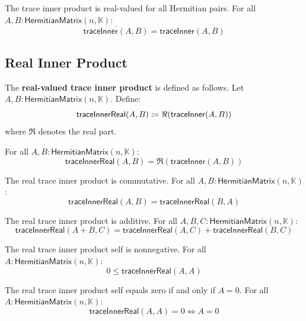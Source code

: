 \begin{theorem}
The trace inner product is real-valued for all Hermitian pairs. For all $A, B : \mathsf{HermitianMatrix}(n, \mathbb{K})$:
\[ \overline{\mathsf{traceInner}(A, B)} = \mathsf{traceInner}(A, B) \]
\end{theorem}

\subsection{Real Inner Product}

\begin{definition}[traceInnerReal]
The \textbf{real-valued trace inner product} is defined as follows. Let $A, B : \mathsf{HermitianMatrix}(n, \mathbb{K})$. Define:
\[ \mathsf{traceInnerReal}(A, B) \coloneqq \Re(\mathsf{traceInner}(A, B)) \]
where $\Re$ denotes the real part.
\end{definition}

\begin{lemma}
For all $A, B : \mathsf{HermitianMatrix}(n, \mathbb{K})$:
\[ \mathsf{traceInnerReal}(A, B) = \Re(\mathsf{traceInner}(A, B)) \]
\end{lemma}

\begin{theorem}
The real trace inner product is commutative. For all $A, B : \mathsf{HermitianMatrix}(n, \mathbb{K})$:
\[ \mathsf{traceInnerReal}(A, B) = \mathsf{traceInnerReal}(B, A) \]
\end{theorem}

\begin{theorem}
The real trace inner product is additive. For all $A, B, C : \mathsf{HermitianMatrix}(n, \mathbb{K})$:
\[ \mathsf{traceInnerReal}(A + B, C) = \mathsf{traceInnerReal}(A, C) + \mathsf{traceInnerReal}(B, C) \]
\end{theorem}

\begin{theorem}
The real trace inner product self is nonnegative. For all $A : \mathsf{HermitianMatrix}(n, \mathbb{K})$:
\[ 0 \le \mathsf{traceInnerReal}(A, A) \]
\end{theorem}

\begin{theorem}
The real trace inner product self equals zero if and only if $A = 0$. For all $A : \mathsf{HermitianMatrix}(n, \mathbb{K})$:
\[ \mathsf{traceInnerReal}(A, A) = 0 \iff A = 0 \]
\end{theorem}
